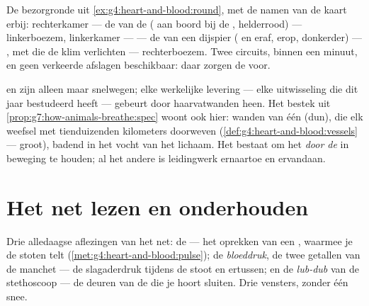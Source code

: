 \begin{example}\label{ex:g7:heart-and-circulation:tour}
De bezorgronde uit \cref{ex:g4:heart-and-blood:round}, met de namen van de
kaart erbij: rechterkamer --- de  van de  ( aan
boord bij de , helderrood) --- linkerboezem, linkerkamer ---
 --- de  van een dijspier ( en  eraf,
 erop, donkerder) --- , met  die de klim
verlichten --- rechterboezem. Twee circuits, binnen een minuut, en geen
verkeerde afslagen beschikbaar: daar zorgen de  voor.
\end{example}

\begin{remark}\label{rem:g7:heart-and-circulation:capillaries}
 en  zijn alleen maar snelwegen; elke werkelijke levering
--- elke uitwisseling die dit jaar bestudeerd heeft --- gebeurt door
haarvatwanden heen. Het bestek uit
\cref{prop:g7:how-animals-breathe:spec} woont ook hier: wanden van één 
(dun), die elk weefsel met tienduizenden kilometers doorweven
(\cref{def:g4:heart-and-blood:vessels} --- groot), badend in het vocht van
het lichaam. Het  bestaat om het  \emph{door de } in
beweging te houden; al het andere is leidingwerk ernaartoe en ervandaan.
\end{remark}

\section{Het net lezen en onderhouden}

\begin{example}\label{ex:g7:heart-and-circulation:measures}
Drie alledaagse aflezingen van het net: de \emph{} --- het
oprekken van een , waarmee je de stoten telt
(\cref{met:g4:heart-and-blood:pulse}); de \emph{bloeddruk}, de twee
getallen van de manchet --- de slagaderdruk tijdens de stoot en ertussen;
en de \emph{lub-dub} van de stethoscoop --- de deuren van de  die
je hoort sluiten. Drie vensters, zonder één snee.
\end{example}

